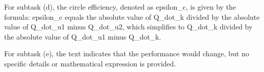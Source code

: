 For subtask (d), the circle efficiency, denoted as epsilon_c, is given by the formula:
epsilon_c equals the absolute value of Q_dot_k divided by the absolute value of Q_dot_u1 minus Q_dot_u2, which simplifies to Q_dot_k divided by the absolute value of Q_dot_u1 minus Q_dot_k.

For subtask (e), the text indicates that the performance would change, but no specific details or mathematical expression is provided.